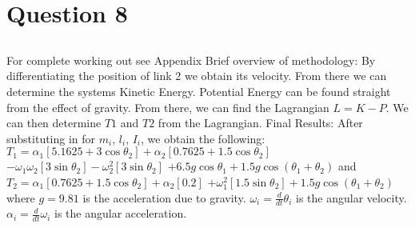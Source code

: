 \section{Question 8}
	\subsection{}
	For complete working out see Appendix %
	Brief overview of methodology:\newline
	By differentiating the position of link 2 we obtain its velocity. From there we can determine the systems Kinetic Energy.\newline
	Potential Energy can be found straight from the effect of gravity.\newline
	From there, we can find the Lagrangian $L = K - P$.\newline
	We can then determine $T1$ and $T2$ from the Lagrangian.\newline
	\newline
	Final Results:\newline
	After substituting in for $m_{i}$, $l_{i}$, $I_{i}$, we obtain the following:\newline \newline
	\hspace{20mm}$T_{1} = \alpha _{1} [5.1625 + 3\cos \theta _{2}] + \alpha _{2} [0.7625 + 1.5\cos \theta _{2}]$\newline
	\hspace{30mm}$ - \omega _{1} \omega _{2} [3\sin \theta _{2}] - \omega ^2 _{2}[3\sin \theta _{2}] $\newline
	\hspace{40mm}$ + 6.5g\cos \theta _{1} + 1.5g\cos (\theta _{1} + \theta _{2})$\newline\newline
	and\newline\newline
	\hspace{20mm}$T_{2} = \alpha _{1} [0.7625 + 1.5\cos \theta _{2}] + \alpha _{2} [0.2]$\newline
	\hspace{30mm}$ + \omega ^2 _{1}[1.5\sin \theta _{2}] + 1.5g\cos (\theta _{1} + \theta _{2})$\newline\newline
	where\newline\newline
		$g = 9.81$ is the acceleration due to gravity.\newline
		$\omega _{i} = \frac{d}{dt} \theta _{i}$ is the angular velocity.\newline
		$\alpha _{i} = \frac{d}{dt} \omega _{i}$ is the angular acceleration.\newline
	\pagebreak	
